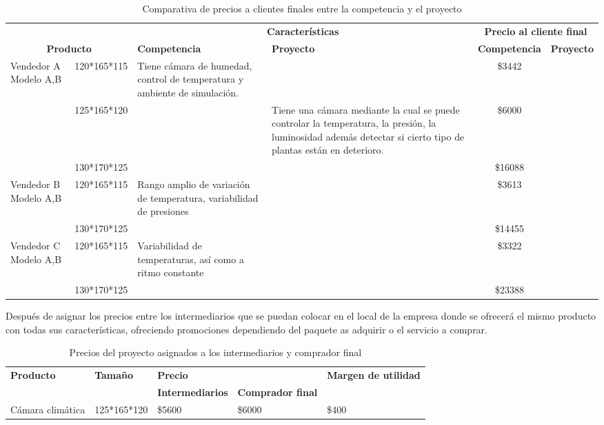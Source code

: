 \begin{table}[h!]
\centering
\begin{adjustbox}{width=\textwidth}
\begin{tabular}{|l|c|c|p{5cm}|p{5cm}|c|c|}
\hline
\multicolumn{3}{|c|}{} & \multicolumn{2}{c|}{\textbf{Características}} & \multicolumn{2}{c|}{\textbf{Precio al cliente final}} \\ \cline{4-7} 
\multicolumn{3}{|c|}{\multirow{-2}{*}{\textbf{Producto}}} & \textbf{Competencia} & \textbf{Proyecto} & \textbf{Competencia} & \textbf{Proyecto} \\ \hline
\multirow{3}{*}{Vendedor A Modelo A,B} & \multicolumn{2}{c|}{120*165*115} & Tiene cámara de humedad, control de temperatura y ambiente de simulación. &  & \$3442 &  \\ \cline{2-7} 
 & \multicolumn{2}{c|}{125*165*120} &  & Tiene una cámara mediante la cual se puede controlar la temperatura, la presión, la luminosidad además detectar si cierto tipo de plantas están en deterioro. & \$6000 &  \\ \cline{2-7} 
 & \multicolumn{2}{c|}{130*170*125} &  &  & \$16088 &  \\ \hline
\multirow{2}{*}{Vendedor B Modelo A,B} & \multicolumn{2}{c|}{120*165*115} & Rango amplio de variación de temperatura, variabilidad de presiones &  & \$3613 &  \\ \cline{2-7} 
 & \multicolumn{2}{c|}{130*170*125} &  &  & \$14455 &  \\ \hline
\multirow{2}{*}{Vendedor C Modelo A,B} & \multicolumn{2}{c|}{120*165*115} & Variabilidad de temperaturas, así como a ritmo constante &  & \$3322 &  \\ \cline{2-7} 
 & \multicolumn{2}{c|}{130*170*125} &  &  & \$23388 &  \\ \hline
\end{tabular}
\end{adjustbox}
\caption{Comparativa de precios a clientes finales entre la competencia y el proyecto \cite{AliExpress}}
\label{tab:comparativa}
\end{table}



Después de asignar los precios entre los intermediarios que se puedan colocar en el local de la empresa donde se ofrecerá el mismo producto con todas sus características, ofreciendo promociones dependiendo del paquete as adquirir o el servicio a comprar. 

\begin{table}[h!]
\centering
\begin{adjustbox}{width=\textwidth}
\begin{tabular}{|l|l|l|l|l|}
\hline
\textbf{Producto} & \textbf{Tamaño} & \multicolumn{2}{l|}{\textbf{Precio}} & \textbf{Margen de utilidad} \\
\cline{3-4}
 & & \textbf{Intermediarios} & \textbf{Comprador final} & \\
\hline
Cámara climática & 125*165*120 & \$5600 & \$6000 & \$400 \\
\hline
\end{tabular}
\end{adjustbox}
\caption{Precios del proyecto asignados a los intermediarios y comprador final}
\end{table}


